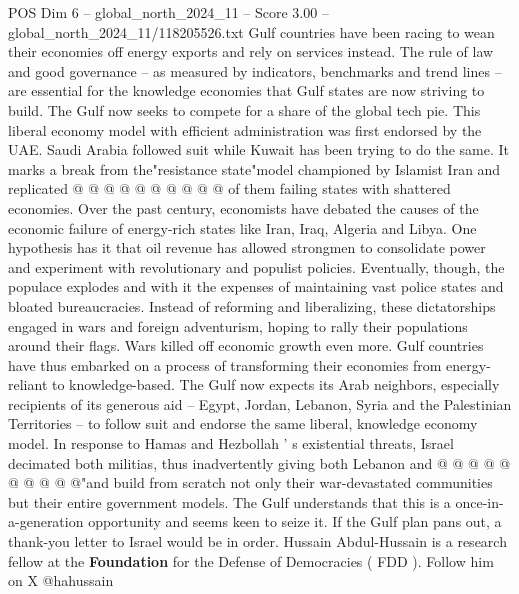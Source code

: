 \begin{textsample}{POS Dim 6 – global\_north\_2024\_11 – Score 3.00 – global\_north\_2024\_11/118205526.txt}
Gulf countries have been racing to wean their economies off energy exports and rely on services instead.
The rule of law and good governance -- as measured by indicators, benchmarks and trend lines -- are essential for the knowledge economies that Gulf states are now striving to build.
The Gulf now seeks to compete for a share of the global tech pie.
This liberal economy model with efficient administration was first endorsed by the UAE.
Saudi Arabia followed suit while Kuwait has been trying to do the same.
It marks a break from the"resistance state"model championed by Islamist Iran and replicated @ @ @ @ @ @ @ @ @ @ of them failing states with shattered economies.
Over the past century, economists have debated the causes of the economic failure of energy-rich states like Iran, Iraq, Algeria and Libya.
One hypothesis has it that oil revenue has allowed strongmen to consolidate power and experiment with revolutionary and populist policies.
Eventually, though, the populace explodes and with it the expenses of maintaining vast police states and bloated bureaucracies.
Instead of reforming and liberalizing, these dictatorships engaged in wars and foreign adventurism, hoping to rally their populations around their flags.
Wars killed off economic growth even more.
Gulf countries have thus embarked on a process of transforming their economies from energy-reliant to knowledge-based.
The Gulf now expects its Arab neighbors, especially recipients of its generous aid -- Egypt, Jordan, Lebanon, Syria and the Palestinian Territories -- to follow suit and endorse the same liberal, knowledge economy model.
In response to Hamas and Hezbollah ' s existential threats, Israel decimated both militias, thus inadvertently giving both Lebanon and @ @ @ @ @ @ @ @ @ @"and build from scratch not only their war-devastated communities but their entire government models.
The Gulf understands that this is a once-in-a-generation opportunity and seems keen to seize it.
If the Gulf plan pans out, a thank-you letter to Israel would be in order.
Hussain Abdul-Hussain is a research fellow at the \textbf{Foundation} for the Defense of Democracies ( FDD ).
Follow him on X @hahussain

\end{textsample}
